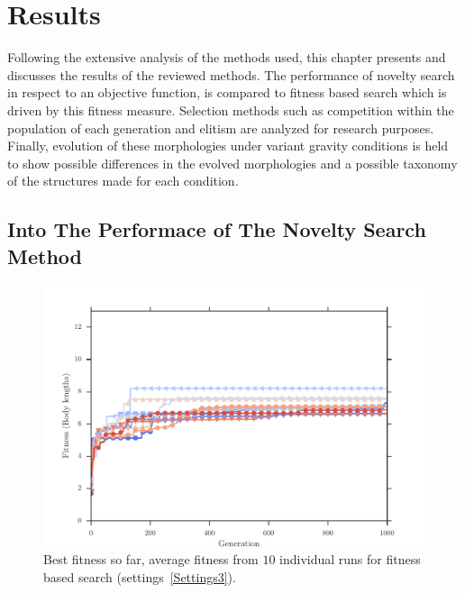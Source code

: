 
\chapter{Results} %

\label{Results} %


Following the extensive analysis of the methods used, this chapter presents and discusses the results of the reviewed methods. The performance of novelty search in respect to an objective function, is compared to fitness based search which is driven by this fitness measure. Selection methods such as competition within the population of each generation and elitism are analyzed for research purposes. Finally, evolution of these morphologies under variant gravity conditions is held to show possible differences in the evolved morphologies and a possible taxonomy of the structures made for each condition.


\section{Into The Performace of The Novelty Search Method}


\begin{figure}[ht!]
\centering
\includegraphics[width=1.0\textwidth]{../Figures/Results/indRunnAvgSize7Fitness.pdf}
\caption{Best fitness so far, average fitness from $10$ individual runs for fitness based search (settings~\ref{Settings3}).}
\label{fig:indRunsAvgSize10Fitness}
\end{figure}

